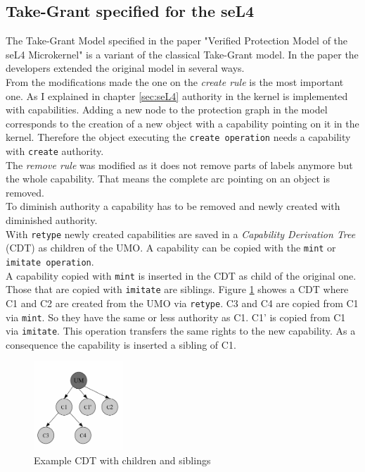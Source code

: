 \subsection{Take-Grant specified for the seL4}\label{specT}
The Take-Grant Model specified in the paper "Verified Protection Model of the seL4 Microkernel" \cite{TakeG} is a variant of the classical Take-Grant model. In the paper the developers extended the original model in several ways. \\
From the modifications made the one on the \textit{create rule} is the most important one. As I explained in chapter \ref{sec:seL4} authority in the kernel is implemented with capabilities. Adding a new node to the protection graph in the model corresponds to the creation of a new object with a capability pointing on it in the kernel. Therefore the object executing the \texttt{create operation} needs a capability with \texttt{create} authority. \\
The \textit{remove rule} was modified as it does not remove parts of labels anymore but the whole capability. That means the complete arc pointing on an object is removed. \\
To diminish authority a capability has to be removed and newly created with diminished authority. \\
With \texttt{retype} newly created capabilities are saved in a \textit{Capability Derivation Tree} (CDT) as children of the UMO. A capability can be copied with the \texttt{mint} or \texttt{imitate operation}. \\ 
A capability  copied with \texttt{mint} is inserted in the CDT as child of the original one. Those that are copied with \texttt{imitate} are siblings. Figure \ref{fig:cdt} showes a CDT where C1 and C2 are created from the UMO via \texttt{retype}. C3 and C4 are copied from C1 via \texttt{mint}. So they have the same or less authority as C1. C1' is copied from C1 via \texttt{imitate}. This operation transfers the same rights to the new capability. As a consequence the capability is inserted a sibling of C1. \\
	\begin{figure}[H]
	\centering
	\includegraphics[width=0.3\textwidth]{./Pictures/CDT.jpg}
	\caption[CDT]{Example CDT with children and siblings \cite{PhDseL4}}
	\label{fig:cdt}
	\end{figure}
